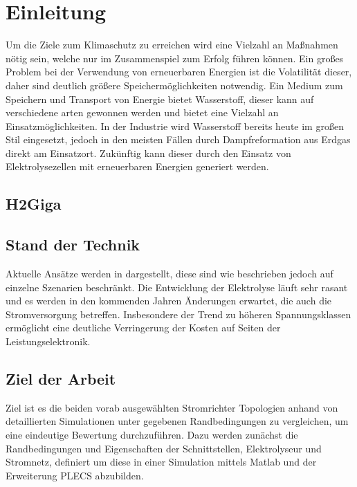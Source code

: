 \chapter{Einleitung}
Um die Ziele zum Klimaschutz zu erreichen wird eine Vielzahl an Maßnahmen nötig sein, welche nur im Zusammenspiel zum Erfolg führen können. Ein großes Problem bei der Verwendung von erneuerbaren Energien ist die Volatilität dieser, daher sind deutlich größere Speichermöglichkeiten notwendig. Ein Medium zum Speichern und Transport von Energie bietet Wasserstoff, dieser kann auf verschiedene arten gewonnen werden und bietet eine Vielzahl an Einsatzmöglichkeiten. In der Industrie wird Wasserstoff bereits heute im großen Stil eingesetzt, jedoch in den meisten Fällen durch Dampfreformation aus Erdgas direkt am Einsatzort. Zukünftig kann dieser durch den Einsatz von Elektrolysezellen mit erneuerbaren Energien generiert werden. 
\cite{Elektrolyse}

\section{H2Giga}




\section{Stand der Technik}
Aktuelle Ansätze werden in \cite{HydrogenRectifier} dargestellt, diese sind wie beschrieben jedoch auf einzelne Szenarien beschränkt. Die Entwicklung der Elektrolyse läuft sehr rasant und es werden in den kommenden Jahren Änderungen erwartet, die auch die Stromversorgung betreffen. Insbesondere der Trend zu höheren Spannungsklassen ermöglicht eine deutliche Verringerung der Kosten auf Seiten der Leistungselektronik.

\section{Ziel der Arbeit}
Ziel ist es die beiden vorab ausgewählten Stromrichter Topologien anhand von detaillierten Simulationen unter gegebenen Randbedingungen zu vergleichen, um eine eindeutige Bewertung durchzuführen. Dazu werden zunächst die Randbedingungen und Eigenschaften der Schnittstellen, Elektrolyseur und Stromnetz, definiert um diese in einer Simulation mittels Matlab und der Erweiterung PLECS abzubilden. 
